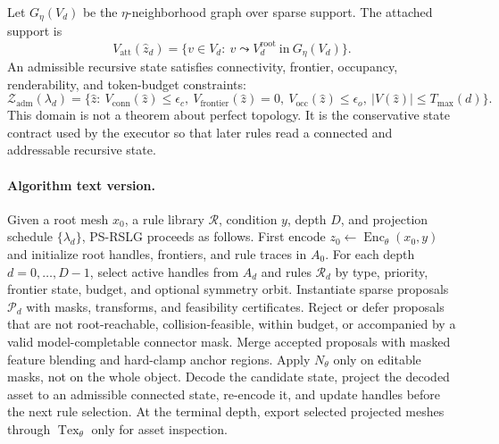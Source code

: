 Let $G_{\eta}(V_d)$ be the $\eta$-neighborhood graph over sparse support. The attached support is
\[
V_{\mathrm{att}}(\hat z_d)=
\{v\in V_d:\ v\leadsto V_d^{\mathrm{root}}\ \mathrm{in}\ G_{\eta}(V_d)\}.
\]
An admissible recursive state satisfies connectivity, frontier, occupancy, renderability, and token-budget constraints:
\[
\mathcal Z_{\mathrm{adm}}(\lambda_d)=
\{\hat z:\ 
V_{\mathrm{conn}}(\hat z)\le\epsilon_c,\ 
V_{\mathrm{frontier}}(\hat z)=0,\ 
V_{\mathrm{occ}}(\hat z)\le\epsilon_o,\ 
|\!V(\hat z)\!|\le T_{\max}(d)\}.
\]
This domain is not a theorem about perfect topology. It is the conservative state contract used by the executor so that later rules read a connected and addressable recursive state. 

\paragraph{Algorithm text version.}
Given a root mesh $x_0$, a rule library $\mathcal R$, condition $y$, depth $D$, and projection schedule $\{\lambda_d\}$, PS-RSLG proceeds as follows. First encode $z_0\leftarrow\operatorname{Enc}_{\theta}(x_0,y)$ and initialize root handles, frontiers, and rule traces in $A_0$. For each depth $d=0,\ldots,D-1$, select active handles from $A_d$ and rules $\mathcal R_d$ by type, priority, frontier state, budget, and optional symmetry orbit. Instantiate sparse proposals $\mathcal P_d$ with masks, transforms, and feasibility certificates. Reject or defer proposals that are not root-reachable, collision-feasible, within budget, or accompanied by a valid model-completable connector mask. Merge accepted proposals with masked feature blending and hard-clamp anchor regions. Apply $N_{\theta}$ only on editable masks, not on the whole object. Decode the candidate state, project the decoded asset to an admissible connected state, re-encode it, and update handles before the next rule selection. At the terminal depth, export selected projected meshes through $\operatorname{Tex}_{\theta}$ only for asset inspection.

